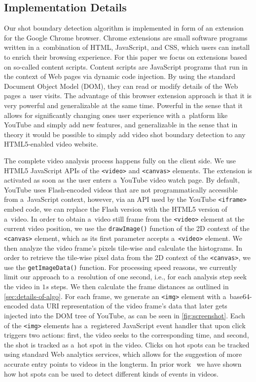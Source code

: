 \subsection{Implementation Details} \label{sec:implementation}
Our shot boundary detection algorithm is implemented in form of an extension for the Google Chrome browser. Chrome extensions are small software programs written in a~combination of HTML, JavaScript, and CSS, which users can install to enrich their browsing experience. For this paper we focus on extensions based on so-called content scripts. Content scripts are JavaScript programs that run in the context of Web pages via dynamic code injection. By using the standard Document Object Model (DOM), they can read or modify details of the Web pages a~user visits. The advantage of this browser extension approach is that it is very powerful and generalizable at the same time. Powerful in the sense that it allows for significantly changing ones user experience with a~platform like YouTube and simply add new features, and generalizable in the sense that in theory it would be possible to simply add video shot boundary detection to any HTML5-enabled video website.

The complete video analysis process happens fully on the client side. We use HTML5 JavaScript APIs of the \texttt{<video>} and \texttt{<canvas>} elements. The extension is activated as soon as the user enters a~YouTube video watch page. By default, YouTube uses Flash-encoded videos that are not programmatically accessible from a~JavaScript context, however, via an API used by the YouTube \texttt{<iframe>} embed code, we can replace the Flash version with the HTML5 version of a~video. In order to obtain a~video still frame from the \texttt{<video>} element at the current video position, we use the \texttt{drawImage()} function of the 2D context of the \texttt{<canvas>} element, which as its first parameter accepts a~\texttt{<video>} element. We then analyze the video frame's pixels tile-wise and calculate the histograms. In order to retrieve the tile-wise pixel data from the 2D context of the \texttt{<canvas>}, we use the \texttt{getImageData()} function. For processing speed reasons, we currently limit our approach to a~resolution of one second, i.e., for each analysis step seek the video in $\mathit{1s}$ steps. We then calculate the frame distances as outlined in \autoref{sec:details-of-algo}. For each frame, we generate an \texttt{<img>} element with a~base64-encoded data URI representation of the video frame's data that later gets injected into the DOM tree of YouTube, as can be seen in \autoref{fig:screenshot}. Each of the \texttt{<img>} elements has a~registered JavaScript event handler that upon click triggers two actions: first, the video seeks to the corresponding time, and second, the shot is tracked as a~hot spot in the video. Clicks on hot spots can be tracked using standard Web analytics services, which allows for the suggestion of more accurate entry points to videos in the longterm. 
In prior work~\cite{derive2011} we have shown how hot spots can be used to detect different kinds of events in videos.

